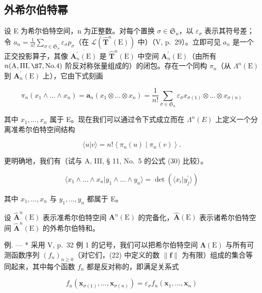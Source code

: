 \subsection{外希尔伯特幂}

设 E 为希尔伯特空间，n 为正整数。对每个置换 \(\sigma\in\mathfrak{S}_{n}\)，以 \(\varepsilon_{\sigma}\) 表示其符号差；令 \(a_{n}=\frac{1}{n!}\sum_{\sigma\in\mathfrak{S}_{n}}\varepsilon_{\sigma}p_{\sigma}\)（在 \(\mathcal{L}(\hat{\mathbf{T}}^{n}(\mathrm{E}))\) 中）（V, p.~29）。立即可见 \(a_{n}\) 是一个正交投影算子，其像 \(\overline{\mathbf{A}_{n}^{\prime}(\mathrm{E})}\) 是 \(\hat{\mathbf{T}}^{n}(\mathrm{E})\) 中空间 \(\mathbf{A}_{n}^{\prime}(\mathrm{E})\)（由所有 \(n(\mathrm{A},\mathrm{III},\S7,\mathrm{No}.4)\) 阶反对称张量组成的）的闭包。存在一个同构 \(\pi_{n}\)（从 \(\Lambda^{n}(\mathrm{E})\) 到 \(\mathbf{A}_{n}^{\prime}(\mathrm{E})\) 上），它由下式刻画

\[
\pi_ {n} (x _ {1} \wedge \ldots \wedge x _ {n}) = \mathbf {a} _ {n} (x _ {1} \otimes \ldots \otimes x _ {n}) = \frac {1}{n !} \sum_ {\sigma \in \mathfrak {S} _ {n}} \varepsilon_ {\sigma} x _ {\sigma (1)} \otimes \ldots \otimes x _ {\sigma (n)}\tag{24}
\]

其中 \(x_{1}, \ldots, x_{n}\) 属于 E。现在我们可以通过令下式成立而在 \(\Lambda^{n}(E)\) 上定义一个分离准希尔伯特空间结构

\[
\langle u | v \rangle = n! \left\langle \pi_ {n} (u) \mid \pi_ {n} (v) \right\rangle .\tag{25}
\]

更明确地，我们有（试与 A, III, § 11, No.~5 的公式 (30) 比较）。

\[
\langle x _ {1} \wedge \dots \wedge x _ {n} | y _ {1} \wedge \dots \wedge y _ {n} \rangle = \det (\langle x _ {i} | y _ {j} ^ {\prime} \rangle)\tag{26}
\]

其中 \(x_{1},\ldots ,x_{n}\) 与 \(y_{1},\ldots ,y_{n}\) 都属于 E。

设 \(\hat{\mathbf{A}}^n (\mathrm{E})\) 表示准希尔伯特空间 \(\mathbf{A}^n (\mathrm{E})\) 的完备化，\(\hat{\mathbf{A}} (\mathrm{E})\) 表示诸希尔伯特空间 \(\hat{\mathbf{A}}^n (\mathrm{E})\) 的外希尔伯特和。

例. --- * 采用 V, p.~32 例 1 的记号，我们可以把希尔伯特空间 \(\symbf{\Lambda}(\mathrm{E})\) 与所有可测函数序列 \((f_n)_{n\geqslant 0}\)（对它们，(22) 中定义的数 \(\| \mathbf{f}\|\) 为有限）组成的集合等同起来，其中每个函数 \(f_{n}\) 都是反对称的，即满足关系式

\[
f _ {n} (\mathbf {x} _ {\sigma (1)}, \dots , \mathbf {x} _ {\sigma (n)}) = \varepsilon_ {\sigma} f _ {n} (\mathbf {x} _ {1}, \dots , \mathbf {x} _ {n})
\]

